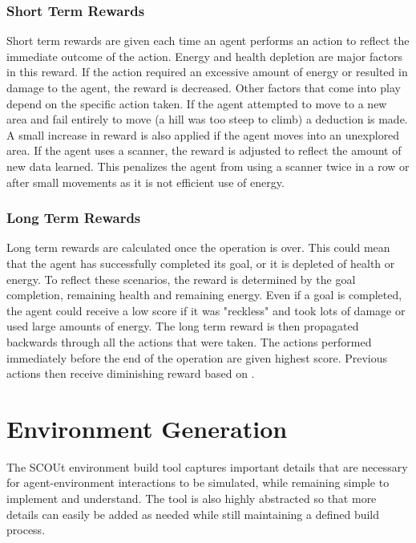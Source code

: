 \subsubsection{Short Term Rewards}
Short term rewards are given each time an agent performs an action to reflect the immediate outcome of the action.
Energy and health depletion are major factors in this reward.
If the action required an excessive amount of energy or resulted in damage to the agent, the reward is decreased.
Other factors that come into play depend on the specific action taken.
If the agent attempted to move to a new area and fail entirely to move (a hill was too steep to climb) a deduction is made.
A small increase in reward is also applied if the agent moves into an unexplored area.
If the agent uses a scanner, the reward is adjusted to reflect the amount of new data learned.
This penalizes the agent from using a scanner twice in a row or after small movements as it is not efficient use of energy.

\subsubsection{Long Term Rewards}
Long term rewards are calculated once the operation is over.
This could mean that the agent has successfully completed its goal, or it is depleted of health or energy.
To reflect these scenarios, the reward is determined by the goal completion, remaining health and remaining energy. 
Even if a goal is completed, the agent could receive a low score if it was "reckless" and took lots of damage or used large amounts of energy.
The long term reward is then propagated backwards through all the actions that were taken.
The actions performed immediately before the end of the operation are given highest score.
Previous actions then receive diminishing reward based on .



\section{Environment Generation}
The SCOUt environment build tool captures important details that are necessary for agent-environment interactions to be simulated, while remaining simple to implement and understand.
The tool is also highly abstracted so that more details can easily be added as needed while still maintaining a defined build process.

